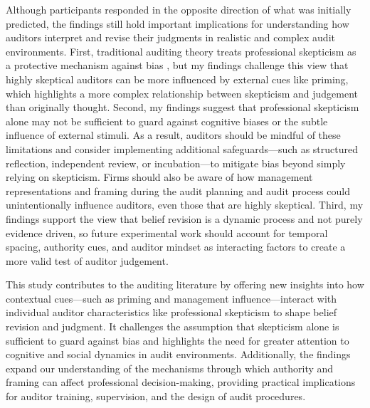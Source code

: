 \documentclass[12pt,english]{article}
\begin{document}
Although participants responded in the opposite direction of what was initially predicted, the findings still hold important implications for understanding how auditors interpret and revise their judgments in realistic and complex audit environments. First, traditional auditing theory treats professional skepticism as a protective mechanism against bias \citep{hurtt2008}, but my findings challenge this view that highly skeptical auditors can be more influenced by external cues like priming, which highlights a more complex relationship between skepticism and judgement than originally thought. Second, my findings suggest that professional skepticism alone may not be sufficient to guard against cognitive biases or the subtle influence of external stimuli. As a result, auditors should be mindful of these limitations and consider implementing additional safeguards—such as structured reflection, independent review, or incubation—to mitigate bias beyond simply relying on skepticism. Firms should also be aware of how management representations and framing during the audit planning and audit process could unintentionally influence auditors, even those that are highly skeptical. Third, my findings support the view that belief revision is a dynamic process and not purely evidence driven, so future experimental work should account for temporal spacing, authority cues, and auditor mindset as interacting factors to create a more valid test of auditor judgement. 

This study contributes to the auditing literature by offering new insights into how contextual cues—such as priming and management influence—interact with individual auditor characteristics like professional skepticism to shape belief revision and judgment. It challenges the assumption that skepticism alone is sufficient to guard against bias and highlights the need for greater attention to cognitive and social dynamics in audit environments. Additionally, the findings expand our understanding of the mechanisms through which authority and framing can affect professional decision-making, providing practical implications for auditor training, supervision, and the design of audit procedures.

\vfill
\pagebreak{}
\begin{spacing}{1.0}


\end{spacing}

\vfill
\pagebreak{}
\clearpage
\end{document}
